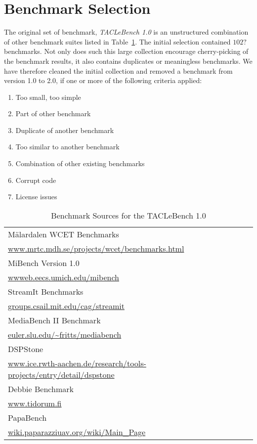 \documentclass[a4paper,10pt]{scrartcl}
\begin{document}
\section{Benchmark Selection}
The original set of benchmark, \textit{TACLeBench 1.0} is an unstructured combination of other benchmark suites listed in Table~\ref{tab:benchSources}. 
The initial selection contained $102?$ benchmarks.
Not only does such this large collection encourage cherry-picking of the benchmark results, it also contains duplicates or meaningless benchmarks.
We have therefore cleaned the initial collection and removed a benchmark from version 1.0 to 2.0, if one or more of the following criteria applied:
\begin{enumerate}[(1)]
 \item Too small, too simple
 \item Part of other benchmark
 \item Duplicate of another benchmark
 \item Too similar to another benchmark
 \item Combination of other existing benchmarks
 \item Corrupt code
 \item License issues
\end{enumerate}

\begin{table}[ht]
\begin{tabular}{|l|}
\hline
{M{\"a}lardalen} {WCET} Benchmarks  \\ \url{www.mrtc.mdh.se/projects/wcet/benchmarks.html}\\\hline
MiBench Version 1.0 			\\ \url{wwweb.eecs.umich.edu/mibench} \\\hline
StreamIt Benchmarks 			\\ \url{groups.csail.mit.edu/cag/streamit} \\\hline
MediaBench II Benchmark 		\\ \url{euler.slu.edu/~fritts/mediabench} \\\hline
DSPStone				\\ \url{www.ice.rwth-aachen.de/research/tools-projects/entry/detail/dspstone} \\\hline
Debbie Benchmark			\\ \url{www.tidorum.fi} \\\hline
PapaBench				\\ \url{wiki.paparazziuav.org/wiki/Main_Page} \\\hline
\end{tabular}
\caption{Benchmark Sources for the TACLeBench 1.0}
\label{tab:benchSources}
\end{table}
\end{document}
